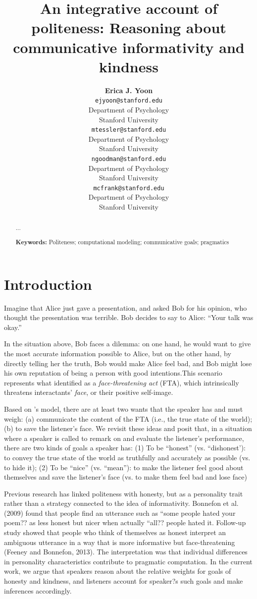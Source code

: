 \documentclass[10pt,letterpaper]{article}
\title{An integrative account of politeness: 
Reasoning about communicative informativity and kindness}
\author{{\large \bf Erica J. Yoon} \\
  \texttt{ejyoon@stanford.edu} \\
  Department of Psychology \\
  Stanford University
  \And {\large \bf Michael Henry Tessler} \\
  \texttt{mtessler@stanford.edu} \\
  Department of Psychology \\
  Stanford University
  \And {\large \bf Noah D. Goodman} \\
  \texttt{ngoodman@stanford.edu} \\
  Department of Psychology \\
  Stanford University
  \And {\large \bf Michael C. Frank} \\
  \texttt{mcfrank@stanford.edu} \\
  Department of Psychology \\
  Stanford University}
\begin{document}
\maketitle


\begin{abstract}

...

\textbf{Keywords:} 
Politeness; computational modeling; communicative goals; pragmatics

\end{abstract}


\section{Introduction}

Imagine that Alice just gave a presentation, and asked Bob for his opinion, who thought the presentation was terrible. Bob decides to say to Alice: ``Your talk was okay.''

In the situation above, Bob faces a dilemma: on one hand, he would want to give the most accurate information possible to Alice, but on the other hand, by directly telling her the truth, Bob would make Alice feel bad, and Bob might lose his own reputation of being a person with good intentions.This scenario represents what  identified as a \emph{face-threatening act} (FTA), which intrinsically threatens interactants' \emph{face}, or their positive self-image. 

Based on 's model, there are at least two wants that the speaker has and must weigh: (a) communicate the content of the FTA (i.e., the true state of the world); (b) to save the listener's face. We revisit these ideas and posit that, in a situation where a speaker is called to remark on and evaluate the listener's performance, there are two kinds of goals a speaker has: (1) To be ``honest'' (vs. ``dishonest'): to convey the true state of the world as truthfully and accurately as possible (vs. to hide it); (2) To be ``nice'' (vs. ``mean''): to make the listener feel good about themselves and save the listener's face (vs. to make them feel bad and lose face)


Previous research has linked politeness with honesty, but as a personality trait rather than a strategy connected to the idea of informativity. Bonnefon et al. (2009) found that people find an utterance such as ``some people hated your poem?? as less honest but nicer when actually ``all?? people hated it. Follow-up study showed that people who think of themselves as honest interpret an ambiguous utterance in a way that is more informative but face-threatening (Feeney and Bonnefon, 2013). The interpretation was that individual differences in personality characteristics contribute to pragmatic computation. In the current work, we argue that speakers reason about the relative weights for goals of honesty and kindness, and listeners account for speaker?s such goals and make inferences accordingly.
\end{document}
